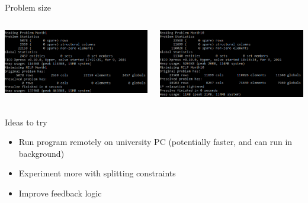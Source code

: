 \documentclass{beamer}
\begin{document}
\begin{frame}{Problem size}
\begin{columns}
\begin{column}{0.5\textwidth}
\includegraphics[width=\textwidth]{size1}
\end{column}
\begin{column}{0.5\textwidth}
\includegraphics[width=\textwidth]{size2}
\end{column}
\end{columns}
\end{frame}

\begin{frame}{Ideas to try}
\begin{itemize}
\item Run program remotely on university PC (potentially faster, and can run in background)
\item Experiment more with splitting constraints
\item Improve feedback logic
\end{itemize}
\end{frame}
\end{document}
